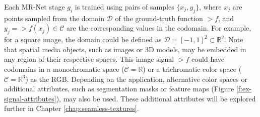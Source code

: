Each MR-Net stage \( g_i \) is trained using pairs of samples \(\{x_j, y_j\}\), where \( x_j \) are points sampled from the domain \(\mathcal{D}\) of the ground-truth function \(\gt{f}\), and \( y_j = \gt{f}(x_j) \in \mathcal{C} \) are the corresponding values in the codomain. For example, for a square image, the domain could be defined as \(\mathcal{D} = [-1, 1]^2 \subset \mathbb{R}^{2}\). Note that spatial media objects, such as images or 3D models, may be embedded in any region of their respective spaces. This image signal \(\gt{f}\) could have codomains in a monochromatic space (\(\mathcal{C} = \mathbb{R}\)) or a trichromatic color space (\(\mathcal{C} = \mathbb{R}^3\)) as the RGB. Depending on the application, alternative color spaces or additional attributes, such as segmentation masks or feature maps (Figure \ref{f:ex-signal-attributes}), may also be used. These additional attributes will be explored further in Chapter \ref{chap:seamless-textures}. 

